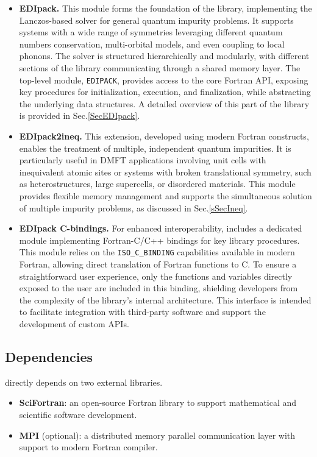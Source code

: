 \documentclass[edipack_sp.tex]{subfiles}
\begin{document}
\begin{itemize}
\item{\bf EDIpack.}
  This module forms the foundation of the library, implementing the 
  Lanczos-based solver for general quantum impurity problems. It 
  supports systems with a wide range of symmetries leveraging different quantum numbers conservation, multi-orbital models, and even coupling to local 
  phonons. The \NAME solver is structured hierarchically and modularly, 
  with different sections of the library communicating through a shared 
  memory layer. The top-level module, {\tt EDIPACK}, provides access 
  to the core Fortran API, exposing key procedures for initialization, 
  execution, and finalization, while abstracting the underlying data 
  structures. A detailed overview of this part of the library is 
  provided in Sec.\ref{SecEDIpack}.
  
\item{\bf EDIpack2ineq.}
  This extension, developed using modern Fortran constructs,
  enables the treatment of multiple, independent quantum 
impurities. It is particularly useful in DMFT applications involving 
unit cells with inequivalent atomic sites or systems with broken 
translational symmetry, such as heterostructures, large supercells, 
or disordered materials. This module provides flexible memory 
management and supports the simultaneous solution of multiple impurity 
problems, as discussed in Sec.\ref{sSecIneq}.



\item{\bf EDIpack C-bindings.}
  For enhanced interoperability, \NAME includes a dedicated module 
implementing Fortran-C/C++ bindings for key library procedures. This 
module relies on the {\tt ISO\_C\_BINDING} capabilities available in 
modern Fortran, allowing direct translation of Fortran functions to C. 
To ensure a straightforward user experience, only the functions and 
variables directly exposed to the user are included in this binding, 
shielding developers from the complexity of the library's internal 
architecture. This interface is intended to facilitate integration 
with third-party software and support the development of custom APIs.
\end{itemize}




\subsection{Dependencies}\label{sSecInstallDependencies}
\NAME directly depends on two external libraries.
\begin{itemize}
\item {\bf SciFortran}: an open-source Fortran library to support
  mathematical and scientific software development. 
\item {\bf MPI} (optional): a distributed memory parallel communication layer with support to modern Fortran compiler.
\end{itemize}
 
\end{document}
